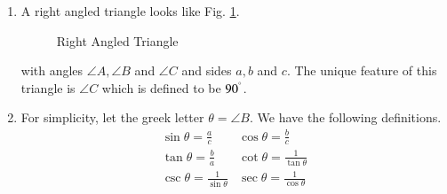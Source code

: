 \renewcommand{\theequation}{\theenumi}
\begin{enumerate}[label=\arabic*.,ref=\thesubsection.\theenumi]

\item


A right angled triangle looks like Fig. \ref{ch1_right}.
\begin{figure}[!ht]
\begin{center}
	
\resizebox{\columnwidth}{!}{}
\end{center}
\caption{Right Angled Triangle}
\label{ch1_right}	
\end{figure}
with angles $\angle A,\angle B$ and $\angle C$ and sides $a, b$ and $c$.  The unique feature of this triangle is $\angle C$ which is defined to be $90^{\degree}$.
\item
	For simplicity, let the greek letter $\theta = \angle B$.  We have the following definitions.
\begin{equation}
\label{ch1_trig_defs}
\begin{matrix}
	\sin \theta = \frac{a}{c} & 	\cos \theta = \frac{b}{c} \\
	\tan \theta = \frac{b}{a} & \cot \theta = \frac{1}{\tan \theta} \\
	\csc \theta = \frac{1}{\sin \theta} & \sec \theta = \frac{1}{\cos \theta}
	\end{matrix}
\end{equation}
\end{enumerate}


